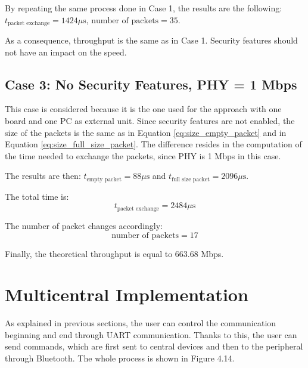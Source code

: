 \documentclass{Configuration_Files/PoliMi3i_thesis}
\begin{document}
By repeating the same process done in Case 1, the results are the following: $t_{\text{packet exchange}} = 1424 \mu \text{s}$, $\text{number of packets} = 35$.

As a consequence, throughput is the same as in Case 1. Security features should not have an impact on the speed.

\subsection*{Case 3: No Security Features, PHY = 1 Mbps}

This case is considered because it is the one used for the approach with one board and one PC as external unit. Since security features are not enabled, the size of the packets is the same as in Equation \ref{eq:size_empty_packet} and in Equation \ref{eq:size_full_size_packet}. The difference resides in the computation of the time needed to exchange the packets, since PHY is 1 Mbps in this case.

The results are then: $t_{\text{empty packet}} = 88 \mu \text{s}$ and $t_{\text{full size packet}} = 2096 \mu \text{s}$.

The total time is:
\begin{equation}
t_{\text{packet exchange}} = 2484 \mu \text{s}
\label{eq:packet_exchange_case3}
\end{equation}

The number of packet changes accordingly:
\begin{equation}
\text{number of packets} = 17
\label{eq:number_of_packets_case3}
\end{equation}

Finally, the theoretical throughput is equal to 663.68 Mbps.

\section{Multicentral Implementation}
As explained in previous sections, the user can control the communication beginning and end through UART communication. Thanks to this, the user can send commands, which are first sent to central devices and then to the peripheral through Bluetooth. The whole process is shown in Figure 4.14.
\end{document}
